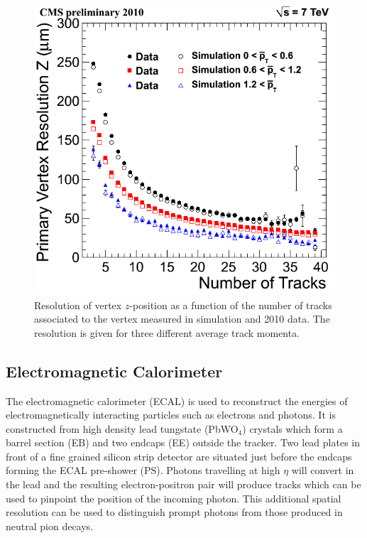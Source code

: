 \begin{figure}
\begin{center}
	\includegraphics[width=.6\textwidth]{detector/trcker/zresotrcker.png}
	\caption{Resolution of vertex $z$-position as a function of the number 
	of tracks associated to the vertex measured in simulation and 2010 data.
 	The resolution is given for three different average track momenta.}
	\label{fig:vtxreso}
\end{center}
\end{figure}

\subsection{Electromagnetic Calorimeter}
The electromagnetic calorimeter (ECAL) is used to reconstruct the energies of electromagnetically 
interacting particles such as electrons and photons. 
It is constructed from high density lead tungstate (PbWO$_{4}$) crystals which
form a barrel section (EB) and two endcaps (EE) outside the tracker. 
Two lead plates in front of a fine grained silicon strip detector are situated just before the 
endcaps forming the ECAL pre-shower (PS). 
Photons travelling at high $\eta$ will convert in the lead and the resulting electron-positron pair
will produce tracks which can be used to pinpoint the position of the incoming photon. This additional
spatial resolution can be used to distinguish prompt photons from those produced
in neutral pion decays.

